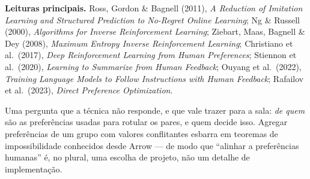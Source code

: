 \documentclass[11pt, a4paper]{article}
\begin{document}
\textbf{Leituras principais.} Ross, Gordon \& Bagnell (2011), \emph{A Reduction
of Imitation Learning and Structured Prediction to No-Regret Online Learning};
Ng \& Russell (2000), \emph{Algorithms for Inverse Reinforcement Learning};
Ziebart, Maas, Bagnell \& Dey (2008), \emph{Maximum Entropy Inverse
Reinforcement Learning}; Christiano et al.\ (2017), \emph{Deep Reinforcement
Learning from Human Preferences}; Stiennon et al.\ (2020), \emph{Learning to
Summarize from Human Feedback}; Ouyang et al.\ (2022), \emph{Training Language
Models to Follow Instructions with Human Feedback}; Rafailov et al.\ (2023),
\emph{Direct Preference Optimization}.

\begin{alertabox}
Uma pergunta que a técnica não responde, e que vale trazer para a sala:
\emph{de quem} são as preferências usadas para rotular os pares, e quem decide
isso. Agregar preferências de um grupo com valores conflitantes esbarra em
teoremas de impossibilidade conhecidos desde Arrow --- de modo que
``alinhar a preferências humanas'' é, no plural, uma escolha de projeto, não um
detalhe de implementação.
\end{alertabox}
\end{document}
